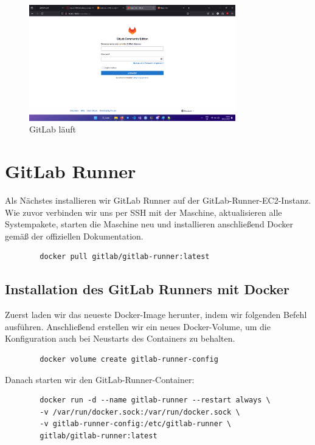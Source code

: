 \documentclass[a4paper,12pt]{article}
\begin{document}
\begin{figure}[H]
	\centering
	\includegraphics[width=0.8\textwidth]{data/GITLAB_GEHT.png}
	\caption{GitLab läuft}
	\label{fig:GitLab läuft}
\end{figure}

\newpage


\section{GitLab Runner}
Als Nächstes installieren wir GitLab Runner auf der GitLab-Runner-EC2-Instanz.  
Wie zuvor verbinden wir uns per SSH mit der Maschine, aktualisieren alle Systempakete, starten die Maschine neu und installieren anschließend Docker gemäß der offiziellen Dokumentation.

\begin{verbatim}
    	docker pull gitlab/gitlab-runner:latest
\end{verbatim}

\subsection{Installation des GitLab Runners mit Docker}
Zuerst laden wir das neueste Docker-Image herunter, indem wir folgenden Befehl ausführen.  
Anschließend erstellen wir ein neues Docker-Volume, um die Konfiguration auch bei Neustarts des Containers zu behalten.

\begin{verbatim}
		docker volume create gitlab-runner-config
\end{verbatim}

Danach starten wir den GitLab-Runner-Container:

\begin{verbatim}
		docker run -d --name gitlab-runner --restart always \
		-v /var/run/docker.sock:/var/run/docker.sock \
		-v gitlab-runner-config:/etc/gitlab-runner \
		gitlab/gitlab-runner:latest
\end{verbatim}
\end{document}
